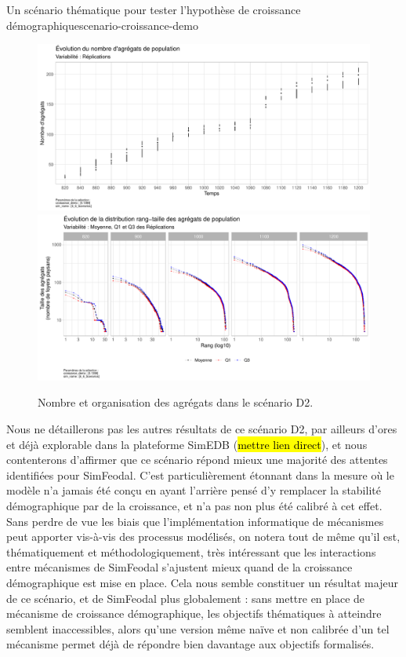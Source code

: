\begin{encadre}{Un scénario thématique pour tester l'hypothèse de croissance démographique}{scenario-croissance-demo}
\begin{figure}[H]
	\centering
	\includegraphics[width=\linewidth]{img/Agregats_Nb_D2.pdf}
	\includegraphics[width=\linewidth]{img/Agregats_RT_D2.pdf}
	\caption{Nombre et organisation des agrégats dans le scénario D2.}
	\label{fig:scenario-D2-agregats}
\end{figure}

Nous ne détaillerons pas les autres résultats de ce scénario D2, par ailleurs d'ores et déjà explorable dans la plateforme SimEDB (\hl{mettre lien direct}), et nous contenterons d'affirmer que ce scénario répond mieux une majorité des attentes identifiées pour SimFeodal.
C'est particulièrement étonnant dans la mesure où le modèle n'a jamais été conçu en ayant l'arrière pensé d'y remplacer la stabilité démographique par de la croissance, et n'a pas non plus été calibré à cet effet.
Sans perdre de vue les biais que l'implémentation informatique de mécanismes peut apporter vis-à-vis des processus modélisés, on notera tout de même qu'il est, thématiquement et méthodologiquement, très intéressant que les interactions entre mécanismes de SimFeodal s'ajustent mieux quand de la croissance démographique est mise en place.
Cela nous semble constituer un résultat majeur de ce scénario, et de SimFeodal plus globalement : sans mettre en place de mécanisme de croissance démographique, les objectifs thématiques à atteindre semblent inaccessibles, alors qu'une version même naïve et non calibrée d'un tel mécanisme permet déjà de répondre bien davantage aux objectifs formalisés.


\end{encadre}
